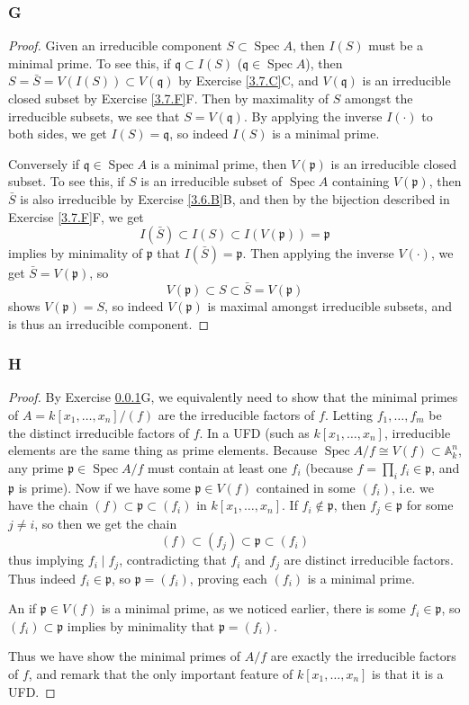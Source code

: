 \documentclass{article}
\newcommand{\A}{\mathbb{A}}
\newcommand{\frkp}{\mathfrak{p}}
\newcommand{\frkq}{\mathfrak{q}}
\DeclareMathOperator{\Spec}{\mathrm{Spec}}
\begin{document}
\subsubsection{G}\label{3.7.G}
\begin{proof}
    Given an irreducible component $S\subset \Spec A$, then $I(S)$ must be a minimal prime. To see this, if $\frkq \subset I(S)$ ($\frkq \in \Spec A$), then $S=\bar S = V(I(S))\subset V(\frkq)$ by Exercise \ref{3.7.C}C, and $V(\frkq)$ is an irreducible closed subset by Exercise \ref{3.7.F}F. Then by maximality of $S$ amongst the irreducible subsets, we see that $S=V(\frkq)$. By applying the inverse $I(\cdot)$ to both sides, we get $I(S)=\frkq$, so indeed $I(S)$ is a minimal prime.

    Conversely if $\frkq \in \Spec A$ is a minimal prime, then $V(\frkp)$ is an irreducible closed subset. To see this, if $S$ is an irreducible subset of $\Spec A$ containing $V(\frkp)$, then $\bar S$ is also irreducible by Exercise \ref{3.6.B}B, and then by the bijection described in Exercise \ref{3.7.F}F, we get
    \[
    I(\bar S) \subset I(S)  \subset I(V(\frkp))=\frkp
    \]
    implies by minimality of $\frkp$ that $I(\bar S)=\frkp$. Then applying the inverse $V(\cdot)$, we get $\bar S = V(\frkp)$, so
    \[
    V(\frkp)\subset S \subset \bar S = V(\frkp)
    \]
    shows $V(\frkp)=S$, so indeed $V(\frkp)$ is maximal amongst irreducible subsets, and is thus an irreducible component.
\end{proof}
\subsubsection{H}\label{3.7.H}
\begin{proof}
    By Exercise \ref{3.7.G}G, we equivalently need to show that the minimal primes of $A=k[x_1,\dots,x_n]/(f)$ are the irreducible factors of $f$. Letting $f_1,\dots, f_m$ be the distinct irreducible factors of $f$. In a UFD (such as $k[x_1,\dots,x_n]$, irreducible elements are the same thing as prime elements. Because $\Spec A/f \cong V(f) \subset \A^n_k$, any prime $\frkp \in \Spec A/f$ must contain at least one $f_i$ (because $f=\prod_i f_i\in \frkp$, and $\frkp$ is prime). Now if we have some $\frkp \in V(f)$ contained in some $(f_i)$, i.e. we have the chain $(f)\subset \frkp \subset (f_i)$ in $k[x_1,\dots, x_n]$. If $f_i \notin \frkp$, then $f_j\in \frkp$ for some $j \ne i$, so then we get the chain
    \[
    (f)\subset (f_j) \subset \frkp \subset (f_i)
    \]
    thus implying $f_i \mid f_j$, contradicting that $f_i$ and $f_j$ are distinct irreducible factors. Thus indeed $f_i \in \frkp$, so $\frkp =(f_i)$, proving each $(f_i)$ is a minimal prime.

    An if $\frkp \in V(f)$ is a minimal prime, as we noticed earlier, there is some $f_i \in \frkp$, so $(f_i)\subset \frkp$ implies by minimality that $\frkp = (f_i)$.

    Thus we have show the minimal primes of $A/f$ are exactly the irreducible factors of $f$, and remark that the only important feature of $k[x_1,\dots, x_n]$ is that it is a UFD.
\end{proof}
\end{document}
